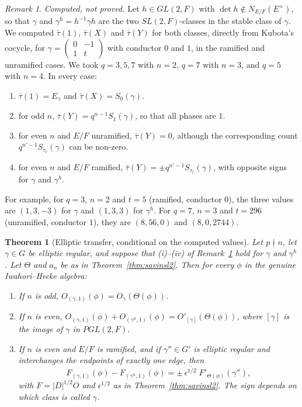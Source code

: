 \documentclass[12pt,letterpaper]{amsart}
\numberwithin{equation}{section}
\newtheorem{theorem}{Theorem}[section]
\theoremstyle{definition}
\theoremstyle{remark}
\newtheorem{vremark}{Remark}
\newcommand{\mat}[4]{\begin{pmatrix} #1 & #2\\ #3 & #4\end{pmatrix}}
\begin{document}
\begin{vremark}
\label{vrem:ellcomputed}
\emph{Computed, not proved.} Let $h\in GL(2,F)$ with $\det h\notin
N_{E/F}(E^\times)$, so that $\gamma$ and $\gamma^h=h^{-1}\gamma h$ are
the two $SL(2,F)$-classes in the stable class of $\gamma$. We computed
$\bar\tau(1)$, $\bar\tau(X)$ and $\bar\tau(Y)$ for both classes,
directly from Kubota's cocycle, for $\gamma=\mat 0{-1}1t$ with
conductor $0$ and $1$, in the ramified and unramified cases. We took
$q=3,5,7$ with $n=2$, $q=7$ with $n=3$, and $q=5$ with $n=4$. In every
case:
\begin{enumerate}[leftmargin=2em,label=(\roman*)]
\item $\bar\tau(1)=E_\gamma$ and $\bar\tau(X)=S_0(\gamma)$.
\item for odd $n$, $\bar\tau(Y)=q^{n-1}S_1(\gamma)$, so that all phases
are $1$.
\item for even $n$ and $E/F$ unramified, $\bar\tau(Y)=0$, although the
corresponding count $q^{n'-1}S_{\tau_r}(\gamma)$ can be non-zero.
\item for even $n$ and $E/F$ ramified, $\bar\tau(Y)=\pm
q^{n'-1}S_{\tau_r}(\gamma)$, with opposite signs for $\gamma$ and
$\gamma^h$.
\end{enumerate}
For example, for $q=3$, $n=2$ and $t=5$ (ramified, conductor $0$), the
three values are $(1,3,-3)$ for $\gamma$ and $(1,3,3)$ for
$\gamma^h$. For $q=7$, $n=3$ and $t=296$ (unramified, conductor $1$),
they are $(8,56,0)$ and $(8,0,2744)$.
\end{vremark}

\begin{theorem}[Elliptic transfer, conditional on the computed values]
\label{thm:ellcond}
Let $p\nmid n$, let $\gamma\in G$ be elliptic regular, and suppose that
(i)--(iv) of Remark~\ref{vrem:ellcomputed} hold for $\gamma$ and
$\gamma^h$. Let $\Theta$ and $a_n$ be as in
Theorem~\ref{thm:savinsl2}. Then for every $\phi$ in the genuine
Iwahori--Hecke algebra:
\begin{enumerate}[leftmargin=2em,label=(\alph*)]
\item If $n$ is odd, $O_{(\gamma,1)}(\phi)=O_\gamma(\Theta(\phi))$.
\item If $n$ is even,
$O_{(\gamma,1)}(\phi)+O_{(\gamma^h,1)}(\phi)=O'_{[\gamma]}(\Theta(\phi))$,
where $[\gamma]$ is the image of $\gamma$ in $PGL(2,F)$.
\item If $n$ is even and $E/F$ is ramified, and if $\gamma''\in G'$ is
elliptic regular and interchanges the endpoints of exactly one edge,
then
\[
F_{(\gamma,1)}(\phi)-F_{(\gamma^h,1)}(\phi)=
\pm\,\overline{\epsilon^{1/2}}\;F'_{\Theta(\phi)}(\gamma''),
\]
with $F=|D|^{1/2}O$ and $\epsilon^{1/2}$ as in
Theorem~\ref{thm:savinsl2}. The sign depends on which class is called
$\gamma$.
\end{enumerate}
\end{theorem}
\end{document}
